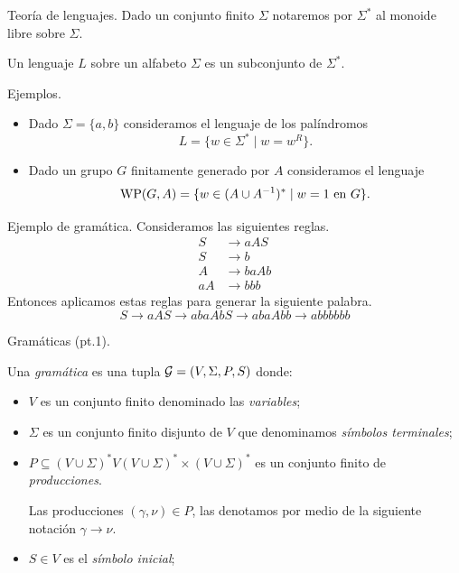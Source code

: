 \documentclass[aspectratio=169, 11pt]{beamer}
\begin{document}
	\begin{frame}[fragile]{Teoría de lenguajes.}
		Dado un conjunto finito $\Sigma$ notaremos por $\Sigma^*$ al monoide libre sobre $\Sigma$.
		
		\begin{deff}
			Un lenguaje $L$ sobre un alfabeto $\Sigma$ es un subconjunto de $\Sigma^*$.
		\end{deff}	
		
		\begin{alertblock}{Ejemplos.}
			\begin{itemize}
				\item 
					Dado $\Sigma = \{a,b\}$ consideramos el lenguaje de los palíndromos
					\[
						L = \{ w \in \Sigma^{*} \mid w = w^{R}  \}.
					\]
				\item 
					Dado un grupo $G$ finitamente generado por $A$ consideramos el lenguaje
					\[
						\text{WP}(G, A) = \{ w \in (A \cup A^{-1})^{*} \mid w = 1 \ \text{en $G$} \}.	
					\]
			\end{itemize}
		\end{alertblock}
	\end{frame}
	
	\begin{frame}[fragile]{Ejemplo de gramática.}
		Consideramos las siguientes reglas.
		\begin{align*}
			S  & \to aAS  \\
			S  & \to b    \\
			A  & \to baAb \\
			aA & \to bbb
		\end{align*}
		Entonces aplicamos estas reglas para generar la siguiente palabra.
		\[
			S \to aAS \to abaAbS \to abaAbb \to abbbbbb	
		\]
	\end{frame}

	\begin{frame}[fragile]{Gramáticas (pt.1).}
		\begin{deff}
			Una \emph{gramática} es una tupla ${\cal G} = (V, \Sigma, P, S)$ donde:
				\begin{itemize}
					\item $V$ es un conjunto finito denominado las \emph{variables};
					\item $\Sigma$ es un conjunto finito disjunto de $V$ que denominamos \emph{símbolos terminales};
					\item $P \subseteq (V \cup \Sigma)^*V(V \cup \Sigma)^* \times (V \cup \Sigma)^*$ es un conjunto finito de \emph{producciones}.
					
					Las producciones $(\gamma, \nu) \in P$, las denotamos por medio de la siguiente notación $\gamma \to \nu$.
					\item $S \in V$ es el \emph{símbolo inicial};
				\end{itemize}
		\end{deff}
	\end{frame}
	
\end{document}
